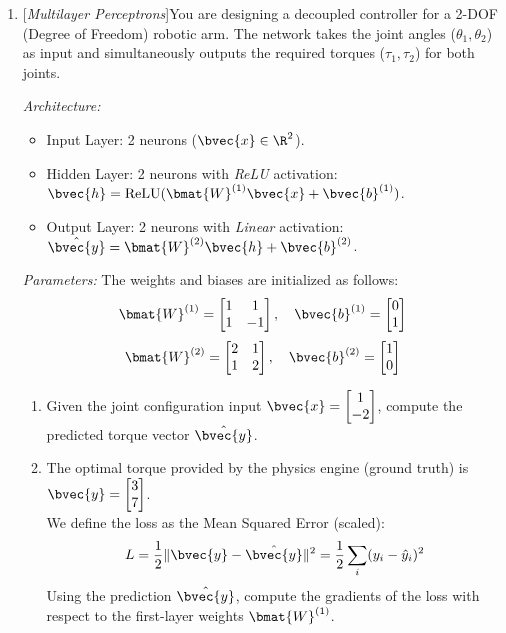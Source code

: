 \documentclass[10pt]{article}
\begin{document}
\begin{enumerate}
\item {} [\textit{Multilayer Perceptrons}]You are designing a decoupled controller for a 2-DOF (Degree of Freedom) robotic arm. The network takes the joint angles ($\theta_1, \theta_2$) as input and simultaneously outputs the required torques ($\tau_1, \tau_2$) for both joints.

\vspace{10pt}
\textit{Architecture:}
\begin{itemize}
    \item Input Layer: 2 neurons ($\bvec{x} \in \R^2$).
    \item Hidden Layer: 2 neurons with \textit{ReLU} activation: $\bvec{h} = \text{ReLU}(\bmat{W}^{(1)}\bvec{x} + \bvec{b}^{(1)})$.
    \item Output Layer: 2 neurons with \textit{Linear} activation: $\hat{\bvec{y}} = \bmat{W}^{(2)}\bvec{h} + \bvec{b}^{(2)}$.
\end{itemize}

\textit{Parameters:}
The weights and biases are initialized as follows:
\[
\bmat{W}^{(1)} = \begin{bmatrix} 1 & 1 \\ 1 & -1 \end{bmatrix}, \quad 
\bvec{b}^{(1)} = \begin{bmatrix} 0 \\ 1 \end{bmatrix}
\]
\[
\bmat{W}^{(2)} = \begin{bmatrix} 2 & 1 \\ 1 & 2 \end{bmatrix}, \quad 
\bvec{b}^{(2)} = \begin{bmatrix} 1 \\ 0 \end{bmatrix}
\]

\begin{enumerate}
    \item Given the joint configuration input $\bvec{x} = \begin{bmatrix} 1 \\ -2 \end{bmatrix}$, compute the predicted torque vector $\hat{\bvec{y}}$. 

    \item The optimal torque provided by the physics engine (ground truth) is $\bvec{y} = \begin{bmatrix} 3 \\ 7 \end{bmatrix}$. \\
    We define the loss as the Mean Squared Error (scaled):
    \[
    L = \frac{1}{2} \| \bvec{y} - \hat{\bvec{y}} \|^2 = \frac{1}{2} \sum_{i} (y_i - \hat{y}_i)^2
    \]
    Using the prediction $\hat{\bvec{y}}$, compute the gradients of the loss with respect to the first-layer weights $\bmat{W}^{(1)}$.


\end{enumerate}
\end{enumerate}
\end{document}
